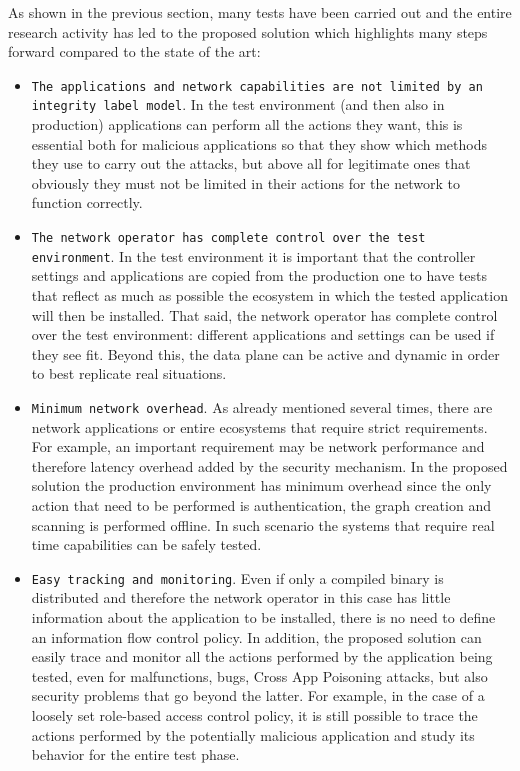 {%
As shown in the previous section, many tests have been carried out and the entire research activity has led to the proposed solution which highlights many steps forward compared to the state of the art:
\begin{itemize}
    \item \texttt{The applications and network capabilities are not limited by an integrity label model}. In the test environment (and then also in production) applications can perform all the actions they want, this is essential both for malicious applications so that they show which methods they use to carry out the attacks, but above all for legitimate ones that obviously they must not be limited in their actions for the network to function correctly.
    \item \texttt{The network operator has complete control over the test environment}. In the test environment it is important that the controller settings and applications are copied from the production one to have tests that reflect as much as possible the ecosystem in which the tested application will then be installed. That said, the network operator has complete control over the test environment: different applications and settings can be used if they see fit. Beyond this, the data plane can be active and dynamic in order to best replicate real situations.
    \item \texttt{Minimum network overhead}. As already mentioned several times, there are network applications or entire ecosystems that require strict requirements. For example, an important requirement may be network performance and therefore latency overhead added by the security mechanism. In the proposed solution the production environment has minimum overhead since the only action that need to be performed is authentication, the graph creation and scanning is performed offline. In such scenario the systems that require real time capabilities can be safely tested.
    \item \texttt{Easy tracking and monitoring}. Even if only a compiled binary is distributed and therefore the network operator in this case has little information about the application to be installed, there is no need to define an information flow control policy. In addition, the proposed solution can easily trace and monitor all the actions performed by the application being tested, even for malfunctions, bugs, Cross App Poisoning attacks, but also security problems that go beyond the latter. For example, in the case of a loosely set role-based access control policy, it is still possible to trace the actions performed by the potentially malicious application and study its behavior for the entire test phase.
\end{itemize}

}
